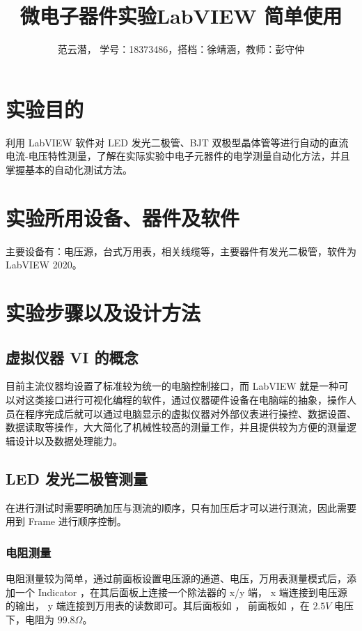 \documentclass[lang=cn,11pt,a4paper,cite=authoryear]{elegantpaper}
\title{微电子器件实验\quad LabVIEW 简单使用}
\author{范云潜， 学号：18373486，搭档：徐靖涵，教师：彭守仲}
\institute{微电子学院 184111 班}
\date{\zhtoday}
\begin{document}
\maketitle


\section{实验目的}

利用 LabVIEW 软件对 LED 发光二极管、BJT 双极型晶体管等进行自动的直流电流-电压特性测量，了解在实际实验中电子元器件的电学测量自动化方法，并且掌握基本的自动化测试方法。

\section{实验所用设备、器件及软件}


主要设备有：电压源，台式万用表，相关线缆等，主要器件有发光二极管，软件为 LabVIEW 2020。

\section{实验步骤以及设计方法}

\subsection{虚拟仪器 VI 的概念}

目前主流仪器均设置了标准较为统一的电脑控制接口，而 LabVIEW 就是一种可以对这类接口进行可视化编程的软件，通过仪器硬件设备在电脑端的抽象，操作人员在程序完成后就可以通过电脑显示的虚拟仪器对外部仪表进行操控、数据设置、数据读取等操作，大大简化了机械性较高的测量工作，并且提供较为方便的测量逻辑设计以及数据处理能力。

\subsection{LED 发光二极管测量}

在进行测试时需要明确加压与测流的顺序，只有加压后才可以进行测流，因此需要用到 Frame 进行顺序控制。 

\subsubsection{电阻测量}

电阻测量较为简单，通过前面板设置电压源的通道、电压，万用表测量模式后，添加一个 Indicator ，在其后面板上连接一个除法器的 x/y 端， x 端连接到电压源的输出， y 端连接到万用表的读数即可。其后面板如  ， 前面板如  ，在 \(2.5 V\) 电压下，电阻为 \(99.8 \Omega\)。
\end{document}
